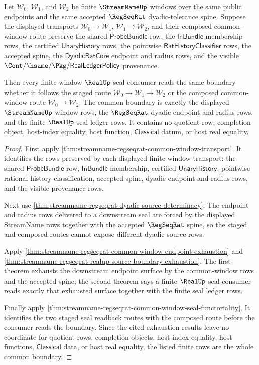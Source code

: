 \begin{theorem}
\label{thm:streamname-regseqrat-finite-window-ledger-confluence}
Let $\mathcal W_0$, $\mathcal W_1$, and $\mathcal W_2$ be finite
$\StreamNameUp$ windows over the same public endpoints and the same accepted
$\RegSeqRat$ dyadic-tolerance spine. Suppose the displayed transports
$\mathcal W_0 \to \mathcal W_1$, $\mathcal W_1 \to \mathcal W_2$, and their
composed common-window route preserve the shared $\mathsf{ProbeBundle}$ row,
the $\mathsf{InBundle}$ membership rows, the certified
$\mathsf{UnaryHistory}$ rows, the pointwise
$\mathsf{RatHistoryClassifier}$ rows, the accepted spine, the
$\mathsf{DyadicRatCore}$ endpoint and radius rows, and the visible
$\Cont/\hsame/\Pkg/\mathsf{RealLedgerPolicy}$ provenance.

Then every finite-window $\RealUp$ seal consumer reads the same boundary
whether it follows the staged route
$\mathcal W_0 \to \mathcal W_1 \to \mathcal W_2$ or the composed
common-window route $\mathcal W_0 \to \mathcal W_2$. The common boundary is
exactly the displayed $\StreamNameUp$ window rows, the $\RegSeqRat$ dyadic
endpoint and radius rows, and the finite $\RealUp$ seal ledger rows. It
contains no quotient row, completion object, host-index equality, host
function, $\mathsf{Classical}$ datum, or host real equality.
\end{theorem}
\begin{proof}
First apply
\autoref{thm:streamname-regseqrat-common-window-transport}. It identifies the
rows preserved by each displayed finite-window transport: the shared
$\mathsf{ProbeBundle}$ row, $\mathsf{InBundle}$ membership, certified
$\mathsf{UnaryHistory}$, pointwise rational-history classification, accepted
spine, dyadic endpoint and radius rows, and the visible provenance rows.

Next use \autoref{thm:streamname-regseqrat-dyadic-source-determinacy}. The
endpoint and radius rows delivered to a downstream seal are forced by the
displayed StreamName rows together with the accepted $\RegSeqRat$ spine, so
the staged and composed routes cannot expose different dyadic source rows.

Apply
\autoref{thm:streamname-regseqrat-common-window-endpoint-exhaustion} and
\autoref{thm:streamname-regseqrat-realup-source-boundary-exhaustion}. The
first theorem exhausts the downstream endpoint surface by the common-window
rows and the accepted spine; the second theorem says a finite $\RealUp$ seal
consumer reads exactly that exhausted surface together with the finite seal
ledger rows.

Finally apply
\autoref{thm:streamname-regseqrat-common-window-seal-functoriality}. It
identifies the two staged seal readback routes with the composed route before
the consumer reads the boundary. Since the cited exhaustion results leave no
coordinate for quotient rows, completion objects, host-index equality, host
functions, $\mathsf{Classical}$ data, or host real equality, the listed finite
rows are the whole common boundary.
\end{proof}

